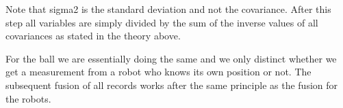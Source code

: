 
\parskip 20pt

Note that {\selectfont sigma2} is the standard deviation and not the covariance. After this step all variables are simply divided by the sum of the inverse values of all covariances as stated in the theory above. 



For the ball we are essentially doing the same and we only distinct whether we get a measurement from a robot who knows its own position or not. The subsequent fusion of all records works after the same principle as the fusion for the robots.




